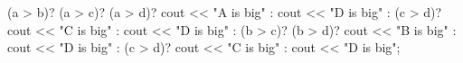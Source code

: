(a > b)?
(a > c)?
(a > d)?
cout << "A is big"
:
cout << "D is big"
:
(c > d)?
cout << "C is big"
:
cout << "D is big"
:
(b > c)?
(b > d)?
cout << "B is big"
:
cout << "D is big"
:
(c > d)?
cout << "C is big"
:
cout << "D is big";